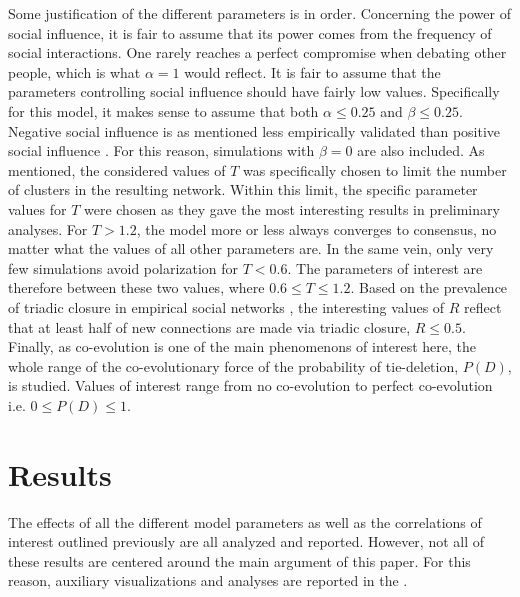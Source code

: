 \documentclass[11pt]{article}
\begin{document}
\noindent Some justification of the different parameters is in order. 
Concerning the power of social influence, it is fair to assume that its power comes from the frequency of social interactions. 
One rarely reaches a perfect compromise when debating other people, which is what $\alpha = 1$ would reflect. It is fair to assume that the parameters controlling social influence should have fairly low values. Specifically for this model, it makes sense to assume that both $\alpha \leq 0.25$ and $\beta \leq 0.25$. Negative social influence is as mentioned less empirically validated than positive social influence \cite{takacs_is_2014, turner_paths_2018}. For this reason, simulations with $\beta = 0$ are also included. 
As mentioned, the considered values of $T$ was specifically chosen to limit the number of clusters in the resulting network. Within this limit, the specific parameter values for $T$ were chosen as they gave the most interesting results in preliminary analyses. For $T > 1.2$, the model more or less always converges to consensus, no matter what the values of all other parameters are. In the same vein, only very few simulations avoid polarization for $T < 0.6$. The parameters of interest are therefore between these two values, where $0.6 \leq T \leq 1.2$. 
Based on the prevalence of triadic closure in empirical social networks \cite{kossinets_origins_2009}, the interesting values of $R$ reflect that at least half of new connections are made via triadic closure, $R \leq 0.5$.
Finally, as co-evolution is one of the main phenomenons of interest here, the whole range of the co-evolutionary force of the probability of tie-deletion, $P(D)$, is studied. Values of interest range from no co-evolution to perfect co-evolution i.e. $0 \leq P(D) \leq 1$.

\section{Results}
The effects of all the different model parameters as well as the correlations of interest outlined previously are all analyzed and reported. However, not all of these results are centered around the main argument of this paper. For this reason, auxiliary visualizations and analyses are reported in the \textit{}.
\end{document}
